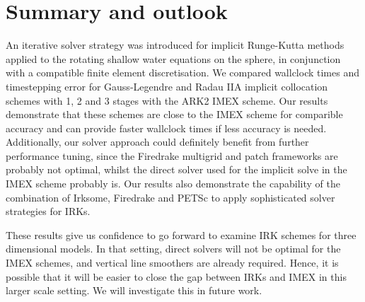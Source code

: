 \documentclass[a4paper, 12pt]{article}
\begin{document}
%
%
%
%
%

 \section{Summary and outlook}
 \label{sec:summary}

An iterative solver strategy was introduced for implicit Runge-Kutta
methods applied to the rotating shallow water equations on the sphere,
in conjunction with a compatible finite element discretisation. We
compared wallclock times and timestepping error for Gauss-Legendre and
Radau IIA implicit collocation schemes with 1, 2 and 3 stages with the
ARK2 IMEX scheme. Our results demonstrate that these schemes are close
to the IMEX scheme for comparible accuracy and can provide faster
wallclock times if less accuracy is needed. Additionally, our solver
approach could definitely benefit from further performance tuning, since
the Firedrake multigrid and patch frameworks are probably not optimal,
whilst the direct solver used for the implicit solve in the IMEX
scheme probably is. Our results also demonstrate the capability of
the combination of Irksome, Firedrake and PETSc to apply sophisticated
solver strategies for IRKs.

These results give us confidence to go forward to examine IRK schemes
for three dimensional models. In that setting, direct solvers will not
be optimal for the IMEX schemes, and vertical line smoothers are
already required. Hence, it is possible that it will be easier to
close the gap between IRKs and IMEX in this larger scale setting. We
will investigate this in future work.
\end{document}
